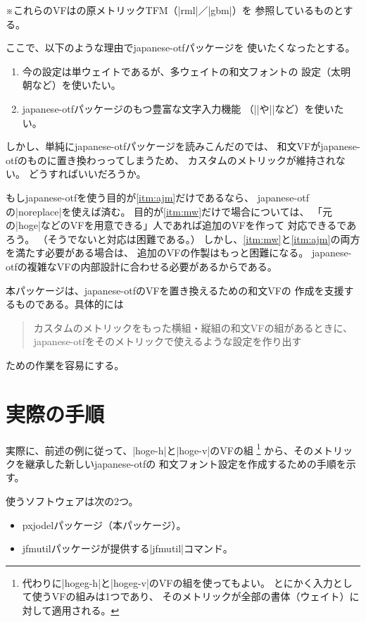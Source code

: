 \documentclass[uplatex,dvipdfmx,a4paper]{jsarticle}
\newcommand{\Pkg}[1]{\textsf{#1}}
\newcommand{\Note}{\par\noindent ※}
\begin{document}
\Note これらのVFは{\pTeX}の原メトリックTFM（|rml|／|gbm|）を
参照しているものとする。

ここで、以下のような理由で\Pkg{japanese-otf}パッケージを
使いたくなったとする。
\begin{enumerate}
\item 今の設定は単ウェイトであるが、多ウェイトの和文フォントの
設定（太明朝など）を使いたい。\label{itm:mw}
\item \Pkg{japanese-otf}パッケージのもつ豊富な文字入力機能
（|\CID|や|\ajMaru|など）を使いたい。\label{itm:ajm}
\end{enumerate}
しかし、単純に\Pkg{japanese-otf}パッケージを読みこんだのでは、
和文VFが\Pkg{japanese-otf}のものに置き換わっってしまうため、
カスタムのメトリックが維持されない。
どうすればいいだろうか。

\medskip

もし\Pkg{japanese-otf}を使う目的が\ref{itm:ajm}だけであるなら、
\Pkg{japanese-otf}の|noreplace|を使えば済む。
目的が\ref{itm:mw}だけで場合については、
「元の|hoge|などのVFを用意できる」人であれば追加のVFを作って
対応できるであろう。
（そうでないと対応は困難である。）
しかし、\ref{itm:mw}と\ref{itm:ajm}の両方を満たす必要がある場合は、
追加のVFの作製はもっと困難になる。
\Pkg{japanese-otf}の複雑なVFの内部設計に合わせる必要があるからである。

\medskip

本パッケージは、\Pkg{japanese-otf}のVFを置き換えるための和文VFの
作成を支援するものである。具体的には
\begin{quote}
カスタムのメトリックをもった横組・縦組の和文VFの組があるときに、
\Pkg{japanese-otf}をそのメトリックで使えるような設定を作り出す
\end{quote}
ための作業を容易にする。

\section{実際の手順}
\label{sec:Procedure}

実際に、前述の例に従って、|hoge-h|と|hoge-v|のVFの組
\footnote{代わりに|hogeg-h|と|hogeg-v|のVFの組を使ってもよい。
  とにかく入力として使うVFの組みは1つであり、
  そのメトリックが全部の書体（ウェイト）に対して適用される。}%
から、そのメトリックを継承した新しい\Pkg{japanese-otf}の
和文フォント設定を作成するための手順を示す。

使うソフトウェアは次の2つ。

\begin{itemize}
\item \Pkg{pxjodel}パッケージ（本パッケージ）。
\item \Pkg{jfmutil}パッケージが提供する|jfmutil|コマンド。
\end{itemize}
\end{document}
